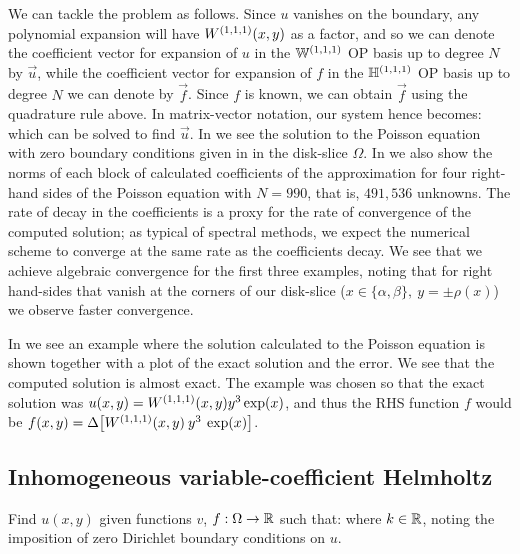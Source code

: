 We can tackle the problem as follows. Since $u$ vanishes on the boundary, any polynomial expansion will have $W^{(1,1,1)}(x,y)$ as a factor, and so we can denote the coefficient vector for expansion of $u$ in the ${\mathbb{W}^{(1,1,1)}}$ OP basis up to degree $N$ by $\vec{u}$, while the coefficient vector for expansion of $f$ in the ${\mathbb{H}^{(1,1,1)}}$ OP basis up to degree $N$ we can denote by $\vec{f}$. Since $f$ is known, we can obtain $\vec{f}$ using the quadrature rule above. In matrix-vector notation, our system hence becomes:
which can be solved to find $\vec{u}$. In  we see the solution to the Poisson equation with zero boundary conditions given in  in the disk-slice $\Omega$. In  we also show the norms of each block of calculated coefficients of the approximation for four right-hand sides of the Poisson equation with $N = 990$, that is, $491,536$ unknowns. The rate of decay in the coefficients is a proxy for the rate of convergence of the computed solution; as typical of spectral methods, we expect the numerical scheme to converge at the same rate as the coefficients decay. We see that we achieve algebraic convergence for the first three examples, noting that for right hand-sides that vanish at the corners of our disk-slice ($x\in\{\alpha,\beta\}, \: y = \pm \rho(x)$) we observe faster convergence. 


In  we see an example where the solution calculated to the Poisson equation is shown together with a plot of the exact solution and the error. We see that the computed solution is almost exact. The example was chosen so that the exact solution was $u(x,y) = W^{(1,1,1)} (x,y) y^3 \exp(x)$, and thus the RHS function $f$ would be $f(x,y) = \Delta \big[ W^{(1,1,1)}(x,y) \: y^3 \: \exp(x) \big]$.


\subsection{Inhomogeneous variable-coefficient Helmholtz}

Find $u(x,y)$ given functions $v$, $f : \Omega \to \mathbb{R}$ such that:
where $k \in \mathbb{R}$, noting the imposition of zero Dirichlet boundary conditions on $u$.

